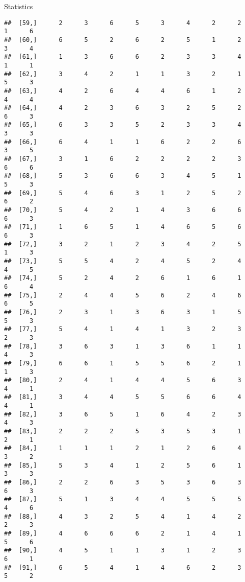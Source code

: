 \documentclass[
  ignorenonframetext,
]{beamer}
\begin{document}
\begin{frame}[fragile]{Statistics}
\begin{verbatim}
##  [59,]      2      3      6      5      3      4      2      2      1      6
##  [60,]      6      5      2      6      2      5      1      2      3      4
##  [61,]      1      3      6      6      2      3      3      4      1      1
##  [62,]      3      4      2      1      1      3      2      1      5      3
##  [63,]      4      2      6      4      4      6      1      2      4      4
##  [64,]      4      2      3      6      3      2      5      2      6      3
##  [65,]      6      3      3      5      2      3      3      4      3      3
##  [66,]      6      4      1      1      6      2      2      6      3      5
##  [67,]      3      1      6      2      2      2      2      3      6      6
##  [68,]      5      3      6      6      3      4      5      1      5      3
##  [69,]      5      4      6      3      1      2      5      2      6      2
##  [70,]      5      4      2      1      4      3      6      6      6      3
##  [71,]      1      6      5      1      4      6      5      6      6      3
##  [72,]      3      2      1      2      3      4      2      5      1      3
##  [73,]      5      5      4      2      4      5      2      4      4      5
##  [74,]      5      2      4      2      6      1      6      1      6      4
##  [75,]      2      4      4      5      6      2      4      6      6      5
##  [76,]      2      3      1      3      6      3      1      5      5      3
##  [77,]      5      4      1      4      1      3      2      3      2      3
##  [78,]      3      6      3      1      3      6      1      1      4      3
##  [79,]      6      6      1      5      5      6      2      1      1      3
##  [80,]      2      4      1      4      4      5      6      3      4      1
##  [81,]      3      4      4      5      5      6      6      4      4      1
##  [82,]      3      6      5      1      6      4      2      3      4      3
##  [83,]      2      2      2      5      3      5      3      1      2      1
##  [84,]      1      1      1      2      1      2      6      4      3      2
##  [85,]      5      3      4      1      2      5      6      1      3      3
##  [86,]      2      2      6      3      5      3      6      3      6      3
##  [87,]      5      1      3      4      4      5      5      5      4      6
##  [88,]      4      3      2      5      4      1      4      2      2      3
##  [89,]      4      6      6      6      2      1      4      1      5      6
##  [90,]      4      5      1      1      3      1      2      3      6      1
##  [91,]      6      5      4      1      4      6      2      3      5      2

\end{verbatim}
\end{frame}
\end{document}
